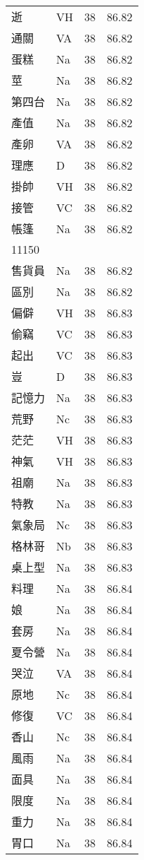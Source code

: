 \documentclass[twocolumn]{book}
\begin{document}
\begin{supertabular}{llrr}
逝 & VH & 38 &  86.82\\
通關 & VA & 38 &  86.82\\
蛋糕 & Na & 38 &  86.82\\
莖 & Na & 38 &  86.82\\
第四台 & Na & 38 &  86.82\\
產值 & Na & 38 &  86.82\\
產卵 & VA & 38 &  86.82\\
理應 & D & 38 &  86.82\\
掛帥 & VH & 38 &  86.82\\
接管 & VC & 38 &  86.82\\
帳篷 & Na & 38 &  86.82\\
11150\\
售貨員 & Na & 38 &  86.82\\
區別 & Na & 38 &  86.82\\
偏僻 & VH & 38 &  86.83\\
偷竊 & VC & 38 &  86.83\\
起出 & VC & 38 &  86.83\\
豈 & D & 38 &  86.83\\
記憶力 & Na & 38 &  86.83\\
荒野 & Nc & 38 &  86.83\\
茫茫 & VH & 38 &  86.83\\
神氣 & VH & 38 &  86.83\\
祖廟 & Na & 38 &  86.83\\
特教 & Na & 38 &  86.83\\
氣象局 & Nc & 38 &  86.83\\
格林哥 & Nb & 38 &  86.83\\
桌上型 & Na & 38 &  86.83\\
料理 & Na & 38 &  86.84\\
娘 & Na & 38 &  86.84\\
套房 & Na & 38 &  86.84\\
夏令營 & Na & 38 &  86.84\\
哭泣 & VA & 38 &  86.84\\
原地 & Nc & 38 &  86.84\\
修復 & VC & 38 &  86.84\\
香山 & Nc & 38 &  86.84\\
風雨 & Na & 38 &  86.84\\
面具 & Na & 38 &  86.84\\
限度 & Na & 38 &  86.84\\
重力 & Na & 38 &  86.84\\
胃口 & Na & 38 &  86.84\\

\end{supertabular}
\end{document}
